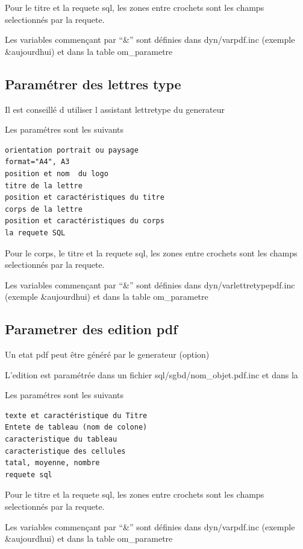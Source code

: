 \documentclass[letterpaper,10pt,french]{manual}
\begin{document}
Pour le titre et la requete sql, les zones entre crochets sont les champs selectionnés par la requete.

Les variables commençant par ``\&'' sont définies dans dyn/varpdf.inc (exemple \&aujourdhui)
et dans la table om\_parametre


\subsection{Paramétrer des lettres type}

Il est conseillé d utiliser l assistant lettretype du generateur

Les paramétres sont les suivants

\begin{Verbatim}[commandchars=@\[\]]
orientation portrait ou paysage
format="A4", A3
position et nom  du logo
titre de la lettre
position et caractéristiques du titre
corps de la lettre
position et caractéristiques du corps
la requete SQL
\end{Verbatim}

Pour le corps, le titre et la requete sql, les zones entre crochets  sont les champs selectionnés par la requete.

Les variables commençant par ``\&'' sont définies dans dyn/varlettretypepdf.inc (exemple \&aujourdhui)
et dans la table om\_parametre


\subsection{Parametrer des edition pdf}

Un etat pdf peut être généré par le generateur (option)

L'edition est paramétrée dans un fichier sql/sgbd/nom\_objet.pdf.inc et dans la

Les paramétres sont les suivants

\begin{Verbatim}[commandchars=@\[\]]
texte et caractéristique du Titre
Entete de tableau (nom de colone)
caracteristique du tableau
caracteristique des cellules
tatal, moyenne, nombre
requete sql
\end{Verbatim}

Pour le titre et la requete sql, les zones entre crochets sont les champs selectionnés par la requete.

Les variables commençant par ``\&'' sont définies dans dyn/varpdf.inc (exemple \&aujourdhui)
et dans la table om\_parametre
\end{document}
